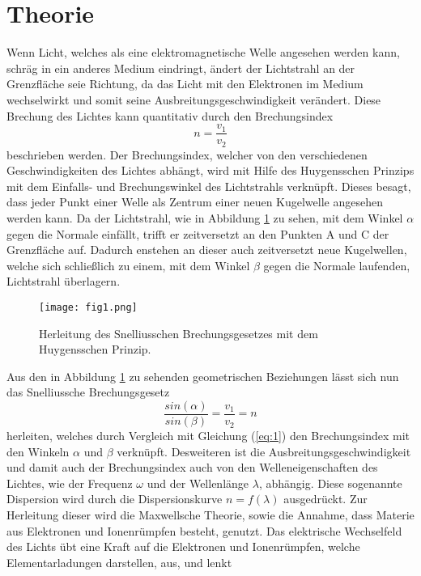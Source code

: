 \section{Theorie}
\label{sec:Theorie}
Wenn Licht, welches als eine elektromagnetische Welle angesehen werden kann, schräg in ein anderes Medium eindringt, ändert der Lichtstrahl an der Grenzfläche
seie Richtung, da das Licht mit den Elektronen im Medium wechselwirkt und somit seine Ausbreitungsgeschwindigkeit verändert. Diese Brechung des Lichtes kann
quantitativ durch den Brechungsindex
\begin{equation}
n=\frac{v_1}{v_2}
\label{eq:1}
\end{equation}
beschrieben werden. Der Brechungsindex, welcher von den verschiedenen Geschwindigkeiten des Lichtes abhängt, wird mit Hilfe des Huygensschen Prinzips mit dem
Einfalls- und Brechungswinkel des Lichtstrahls verknüpft. Dieses besagt, dass jeder Punkt einer Welle als Zentrum einer neuen Kugelwelle angesehen werden kann.
Da der Lichtstrahl, wie in Abbildung \ref{fig:1} zu sehen, mit dem Winkel $\alpha$ gegen die Normale einfällt, trifft er zeitversetzt an den Punkten A und C
der Grenzfläche auf. Dadurch enstehen an dieser auch zeitversetzt neue Kugelwellen, welche sich schließlich zu einem, mit dem Winkel $\beta$ gegen die Normale
laufenden, Lichtstrahl überlagern.
\begin{figure}
  \centering
  \texttt{[image: fig1.png]}
  \caption{Herleitung des Snelliusschen Brechungsgesetzes mit dem Huygensschen Prinzip. \cite{1}}
  \label{fig:1}
\end{figure}
Aus den in Abbildung \ref{fig:1} zu sehenden geometrischen Beziehungen lässt sich nun das Snelliussche Brechungsgesetz
\begin{equation}
\frac{sin(\alpha)}{sin(\beta)} = \frac{v_1}{v_2} = n
\label{eq:2}
\end{equation}
herleiten, welches durch Vergleich mit Gleichung (\ref{eq:1}) den Brechungsindex mit den Winkeln $\alpha$ und $\beta$ verknüpft.
Desweiteren ist die Ausbreitungsgeschwindigkeit und damit auch der Brechungsindex auch von den Welleneigenschaften  des Lichtes, wie der Frequenz $\omega$ und der
Wellenlänge $\lambda$, abhängig.
Diese sogenannte Dispersion wird durch die Dispersionskurve $n=f(\lambda)$ ausgedrückt.
Zur Herleitung dieser wird die Maxwellsche Theorie, sowie die Annahme, dass Materie aus Elektronen und Ionenrümpfen besteht, genutzt.
Das elektrische Wechselfeld des Lichts übt eine Kraft auf die Elektronen und Ionenrümpfen, welche Elementarladungen darstellen, aus, und lenkt
